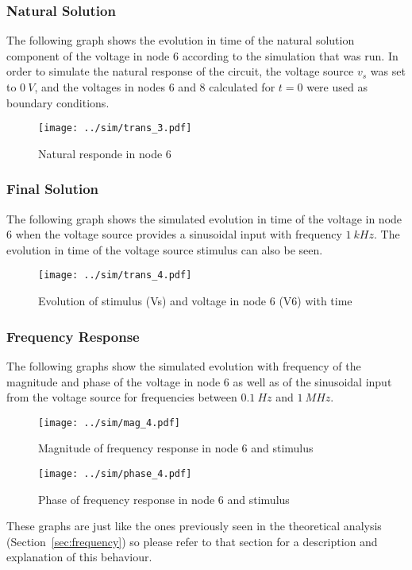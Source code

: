 \subsubsection{Natural Solution}

The following graph shows the evolution in time of the natural solution component of the voltage in node 6 according to the simulation that was run. In order to simulate the natural response of the circuit, the voltage source $v_s$ was set to $0 \ V$, and the voltages in nodes 6 and 8 calculated for $t=0$ were used as boundary conditions.

\begin{figure}[H] \centering
\texttt{[image: ../sim/trans\_3.pdf]}
\caption{Natural responde in node 6}
\label{fig:natural_sim}
\end{figure}

\subsubsection{Final Solution}

The following graph shows the simulated evolution in time of the voltage in node 6 when the voltage source provides a sinusoidal input with frequency $1 \ kHz$. The evolution in time of the voltage source stimulus can also be seen.

\begin{figure}[H] \centering
\texttt{[image: ../sim/trans\_4.pdf]}
\caption{Evolution of stimulus (Vs) and voltage in node 6 (V6) with time}
\label{fig:final_sim}
\end{figure}

\subsubsection{Frequency Response}

The following graphs show the simulated evolution with frequency of the magnitude and phase of the voltage in node 6 as well as of the sinusoidal input from the voltage source for frequencies between $0.1 \ Hz$ and $1 \ MHz$.

\begin{figure}[H] \centering
\texttt{[image: ../sim/mag\_4.pdf]}
\caption{Magnitude of frequency response in node 6 and stimulus}
\label{fig:mag_sim}
\end{figure}


\begin{figure}[H] \centering
\texttt{[image: ../sim/phase\_4.pdf]}
\caption{Phase of frequency response in node 6 and stimulus}
\label{fig:phase_sim}
\end{figure}


These graphs are just like the ones previously seen in the theoretical analysis (Section~\ref{sec:frequency}) so please refer to that section for a description and explanation of this behaviour.
